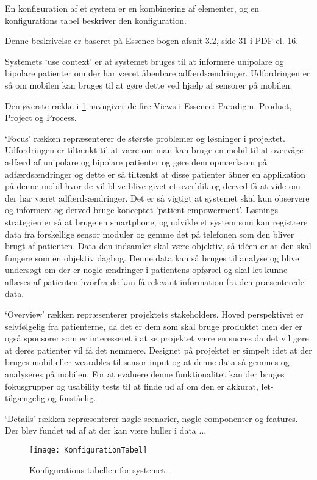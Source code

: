 En konfiguration af et system er en kombinering af elementer, og en konfigurations tabel beskriver den konfiguration.

Denne beskrivelse er baseret på Essence bogen afsnit 3.2, side 31 i PDF el. 16.

Systemets `use context' er at systemet bruges til at informere unipolare og bipolare patienter om der har været åbenbare adfærdsændringer. Udfordringen er så om mobilen kan bruges til at gøre dette ved hjælp af sensorer på mobilen.

Den øverste række i \cref{tab:konfigurationsTabel} navngiver de fire Views i Essence: Paradigm, Product, Project og Process.

`Focus' rækken repræsenterer de største problemer og løsninger i projektet. 
Udfordringen er tiltænkt til at være om man kan bruge en mobil til at overvåge adfærd af unipolare og bipolare patienter og gøre dem opmærksom på adfærdsændringer og dette er så tiltænkt at disse patienter åbner en applikation på denne mobil hvor de vil blive blive givet et overblik og derved få at vide om der har været adfærdsændringer. 
Det er så vigtigt at systemet skal kun observere og informere og derved bruge konceptet 'patient empowerment'.
Løsnings strategien er så at bruge en smartphone, og udvikle et system som kan registrere data fra forskellige sensor moduler og gemme det på telefonen som den bliver brugt af patienten.
Data den indsamler skal være objektiv, så idéen er at den skal fungere som en objektiv dagbog.
Denne data kan så bruges til analyse og blive undersøgt om der er nogle ændringer i patientens opførsel og skal let kunne aflæses af patienten hvorfra de kan få relevant information fra den præsenterede data. 

`Overview' rækken repræsenterer projektets stakeholders. Hoved perspektivet er selvfølgelig fra patienterne, da det er dem som skal bruge produktet men der er også sponsorer som er interesseret i at se projektet være en succes da det vil gøre at deres patienter vil få det nemmere. 
Designet på projektet er simpelt idet at der bruges mobil eller wearables til sensor input og at denne data så gemmes og analyseres på mobilen. 
For at evaluere denne funktionalitet kan der bruges fokusgrupper og usability tests til at finde ud af om den er akkurat, let-tilgængelig og forståelig.

`Details' rækken repræsenterer nøgle scenarier, nøgle componenter og features.
Der blev fundet ud af at der kan være huller i data ... 

\begin{figure}[h]
\texttt{[image: KonfigurationTabel]}
\caption{Konfigurations tabellen for systemet.}
\label{tab:konfigurationsTabel}
\end{figure}
